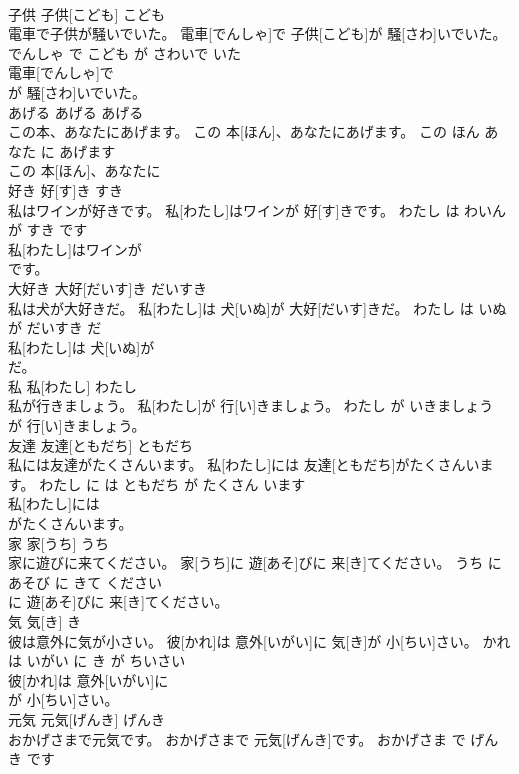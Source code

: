 \documentclass[8pt]{extreport}
\begin{document}
\begin{CJK}{UTF8}{min}
\\	子供	子供[こども]	こども	
\\	電車で子供が騒いでいた。	電車[でんしゃ]で 子供[こども]が 騒[さわ]いでいた。	でんしゃ で こども が さわいで いた	
\\	電車[でんしゃ]で
\\	が 騒[さわ]いでいた。		
\\	あげる	あげる	あげる	
\\	この本、あなたにあげます。	この 本[ほん]、あなたにあげます。	この ほん あなた に あげます	
\\	この 本[ほん]、あなたに
\\	好き	好[す]き	すき	
\\	私はワインが好きです。	私[わたし]はワインが 好[す]きです。	わたし は わいん が すき です	
\\	私[わたし]はワインが
\\	です。		
\\	大好き	大好[だいす]き	だいすき	
\\	私は犬が大好きだ。	私[わたし]は 犬[いぬ]が 大好[だいす]きだ。	わたし は いぬ が だいすき だ	
\\	私[わたし]は 犬[いぬ]が
\\	だ。		
\\	私	私[わたし]	わたし	
\\	私が行きましょう。	私[わたし]が 行[い]きましょう。	わたし が いきましょう	
\\	が 行[い]きましょう。		
\\	友達	友達[ともだち]	ともだち	
\\	私には友達がたくさんいます。	私[わたし]には 友達[ともだち]がたくさんいます。	わたし に は ともだち が たくさん います	
\\	私[わたし]には
\\	がたくさんいます。		
\\	家	家[うち]	うち	
\\	家に遊びに来てください。	家[うち]に 遊[あそ]びに 来[き]てください。	うち に あそび に きて ください	
\\	に 遊[あそ]びに 来[き]てください。		
\\	気	気[き]	き	
\\	彼は意外に気が小さい。	彼[かれ]は 意外[いがい]に 気[き]が 小[ちい]さい。	かれ は いがい に き が ちいさい	
\\	彼[かれ]は 意外[いがい]に
\\	が 小[ちい]さい。		
\\	元気	元気[げんき]	げんき	
\\	おかげさまで元気です。	おかげさまで 元気[げんき]です。	おかげさま で げんき です	

\end{CJK}
\end{document}
